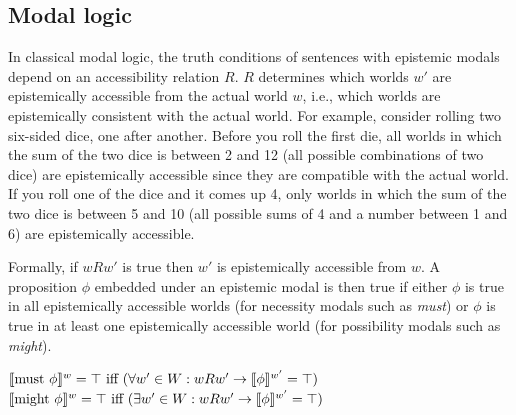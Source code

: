 
\subsection{Modal logic}

In classical modal logic, the truth conditions of sentences with epistemic modals depend on an accessibility relation $R$.
$R$ determines which worlds $w'$ are epistemically accessible from the actual world $w$, i.e., which worlds are epistemically consistent with
the actual world. For example, consider rolling two six-sided dice, one after another. Before you roll the first die, all worlds in which the sum of
the two dice is between 2 and 12 (all possible combinations of two dice) are epistemically accessible since they are compatible with the actual
world. If you roll one of the dice and it comes up 4, only worlds in which the sum of the two dice is between 5 and 10 (all possible sums of 4 and 
a number between 1 and 6) are epistemically accessible. 

Formally, if $wRw'$ is true then $w'$ is epistemically accessible from $w$. A proposition $\phi$ embedded under an epistemic modal is then true
if either $\phi$ is  true in all epistemically accessible worlds (for necessity modals such as \textit{must}) or $\phi$ is true in at least one epistemically 
accessible world (for possibility modals such as \textit{might}).

\begin{exe}
\ex \label{ex:modall-must} $\llbracket\mbox{must } \phi\rrbracket^{w}  = \top \mbox{ iff } ( \forall w' \in W: wRw' \rightarrow  \llbracket\phi\rrbracket^{w'} = \top)$
\ex \label{ex:modall-might} $\llbracket\mbox{might } \phi\rrbracket^{w}  = \top \mbox{ iff } (\exists w' \in W: wRw' \rightarrow  \llbracket\phi\rrbracket^{w'} = \top)$
\end{exe}

